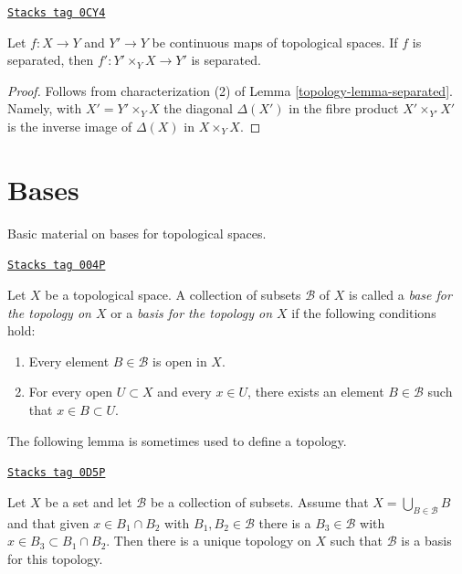 \begin{lemma}
\label{topology-lemma-base-change-separated}
\href{https://stacks.math.columbia.edu/tag/0CY4}{\texttt{Stacks tag 0CY4}}

Let $f : X \to Y$ and $Y' \to Y$ be continuous maps of topological spaces.
If $f$ is separated, then $f' : Y' \times_Y X \to Y'$ is separated.
\end{lemma}

\begin{proof}

Follows from characterization (2) of Lemma \ref{topology-lemma-separated}.
Namely, with $X' = Y' \times_Y X$ the diagonal $\Delta(X')$
in the fibre product $X' \times_{Y'} X'$ is the inverse image of
$\Delta(X)$ in $X \times_Y X$.
\end{proof}

\section{Bases}
\label{topology-section-bases}
Basic material on bases for topological spaces.

\begin{definition}[Base]
\label{topology-definition-base}
\href{https://stacks.math.columbia.edu/tag/004P}{\texttt{Stacks tag 004P}}

Let $X$ be a topological space. A collection of subsets $\mathcal{B}$ of $X$
is called a {\it base for the topology on $X$} or a {\it basis for the
topology on $X$} if the following conditions hold:
\begin{enumerate}
\item Every element $B \in \mathcal{B}$ is open in $X$.
\item For every open $U \subset X$ and every $x \in U$,
there exists an element $B \in \mathcal{B}$ such that
$x \in B \subset U$.
\end{enumerate}
\end{definition}

The following lemma is sometimes used to define a topology.

\begin{lemma}
\label{topology-lemma-make-base}
\href{https://stacks.math.columbia.edu/tag/0D5P}{\texttt{Stacks tag 0D5P}}

Let $X$ be a set and let $\mathcal{B}$ be a collection of subsets.
Assume that $X = \bigcup_{B \in \mathcal{B}} B$ and that given
$x \in B_1 \cap B_2$ with $B_1, B_2 \in \mathcal{B}$ there is a
$B_3 \in \mathcal{B}$ with $x \in B_3 \subset B_1 \cap B_2$.
Then there is a unique topology on $X$ such that $\mathcal{B}$
is a basis for this topology.
\end{lemma}

